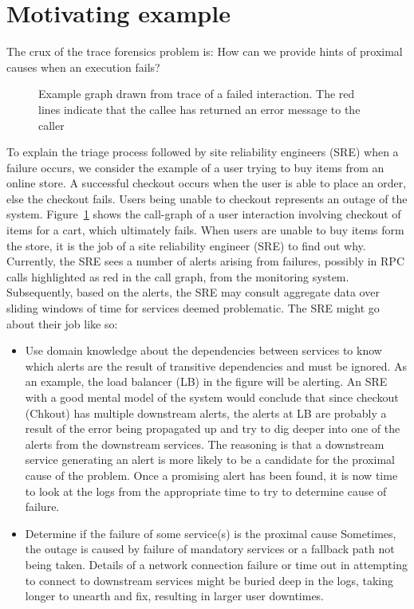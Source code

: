 \section{Motivating example}

The crux of the trace forensics problem is: How can we provide hints of proximal causes when an execution fails? 

\begin{figure}[h]
\caption{Example graph drawn from trace of a failed interaction. The red lines indicate that the callee has returned an error message to the caller}
\label{Failed_ex}
\end{figure}

To explain the triage process followed by site reliability engineers (SRE) when a failure occurs, we consider the example of a user trying to buy items from an online store. A successful checkout occurs when the user is able to place an order, else the checkout fails. Users being unable to checkout represents an outage of the system. Figure~\ref{Failed_ex} shows the  call-graph of a user interaction involving checkout of items for a cart, which ultimately fails. When users are unable to buy items form the store, it is the job of a site reliability engineer (SRE) to find out why. 
Currently, the SRE sees a number of alerts arising from failures, possibly in RPC calls highlighted as red in the call graph, from the monitoring system.  Subsequently, based on the alerts, the SRE may consult aggregate data over sliding windows of time for services deemed problematic.
The SRE might go about their job like so:
\begin{itemize}
\item Use domain knowledge about the dependencies between services to know which alerts are the result of transitive dependencies and must be ignored. \newline
As an example, the load balancer (LB) in the figure will be alerting. 
An SRE with a good mental model of the system would conclude that since checkout (Chkout) has multiple downstream alerts, the alerts at LB are probably a result of the error being propagated up and try to dig deeper into one of the alerts from the downstream services. The reasoning is that a downstream service generating an alert is more likely to be a candidate for the proximal cause of the problem.  
Once a promising alert has been found, it is now time to look at the logs from the appropriate time to try to determine cause of failure.
\item Determine if the failure of some service(s) is the proximal cause \newline
Sometimes, the outage is caused by failure of mandatory services or a fallback path not being taken. Details of a network connection failure or time out in attempting to connect to downstream services might be buried deep in the logs, taking longer to unearth and fix, resulting in larger user downtimes. 
\end{itemize}


